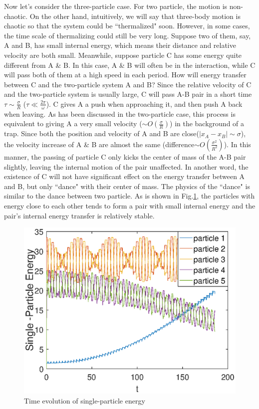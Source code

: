 \documentclass[aps,preprintnumbers,onecolumn,amsmath,amssymb,floatfix,pra]{revtex4-1}
\begin{document}
Now let's consider the three-particle case. For two particle, the motion is non-chaotic. On the other hand, intuitively, we will say that three-body motion is chaotic so that the system could be ``thermalized" soon. However, in some cases, the time scale of thermalizing could still be very long. Suppose two of them, say, A and B, has small internal energy, which means their distance and relative velocity are both small. Meanwhile, suppose particle C has some energy quite different from A \& B. In this case, A \& B will often be in the interaction, while C will pass both of them at a high speed in each period. How will energy transfer between C and the two-particle system A and B? Since the relative velocity of C and the two-particle system is usually large, C will pass A-B pair in a short time $\tau\sim\frac{\sigma}{R}$ ($\tau\ll\frac{2\pi}{\omega}$). C gives A a push when approaching it, and then push A back when leaving.  As has been discussed in the two-particle case, this process is equivalent to giving A a very small velocity ($\sim O(\frac{\sigma}{R})$) in the background of a trap. Since both the position and velocity of A and B are close($|x_A-x_B|\sim\sigma$), the velocity increase of A \& B are almost the same (difference$\sim O(\frac{\sigma^2}{R^2})$). In this manner, the passing of particle C only kicks the center of mass of the A-B pair slightly, leaving the internal motion of the pair unaffected. In another word, the existence of C will not have significant effect on the energy transfer between A and B, but only ``dance" with their center of mass. The physics of the ``dance" is similar to the dance between two particle. As is shown in Fig.\ref{fig:thermalization4}, the particles with energy close to each other tends to form a pair with small internal energy and the pair's internal energy transfer is relatively stable.


\begin{figure}
\centering
\includegraphics[scale=0.5]{ZhiyuPictures/pair1_pre.eps}
\caption{Time evolution of single-particle energy}
\label{fig:thermalization4}
\end{figure}
\end{document}
